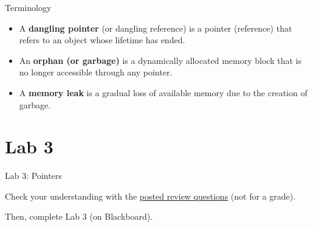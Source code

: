 \documentclass[14pt,aspectratio=1610]{beamer}
\begin{document}
\begin{frame}{Terminology}

\begin{itemize}
\item
  A \textbf{dangling pointer} (or dangling reference) is a pointer (reference)
  that refers to an object whose lifetime has ended.
\item
  An \textbf{orphan (or garbage)} is a dynamically allocated memory block that is no
  longer accessible through any pointer.
\item
  A \textbf{memory leak} is a gradual loss of available memory due to the
  creation of garbage.
\end{itemize}
\end{frame}



\section*{Lab 3}

\begin{frame}{Lab 3: Pointers}
\begin{center}\Large
Check your understanding with the \href{https://csu-cs.github.io/csci-315/lectures/03-memory-management\#review-questions}{posted review questions} (not for a grade).

\vspace{1em}
Then, complete Lab 3 (on Blackboard).
\end{center}
\end{frame}
\end{document}
